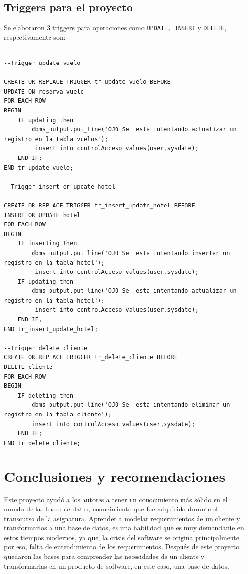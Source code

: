 \documentclass{article}
\begin{document}
\subsection{Triggers para el proyecto}
Se elaboraron 3 triggers para operaciones como \texttt{UPDATE, INSERT} y \texttt{DELETE}, respectivamente son:
\begin{lstlisting}

--Trigger update vuelo

CREATE OR REPLACE TRIGGER tr_update_vuelo BEFORE
UPDATE ON reserva_vuelo
FOR EACH ROW
BEGIN
    IF updating then
        dbms_output.put_line('OJO Se  esta intentando actualizar un registro en la tabla vuelos');
         insert into controlAcceso values(user,sysdate);
    END IF;
END tr_update_vuelo;

--Trigger insert or update hotel

CREATE OR REPLACE TRIGGER tr_insert_update_hotel BEFORE
INSERT OR UPDATE hotel
FOR EACH ROW
BEGIN
    IF inserting then
        dbms_output.put_line('OJO Se  esta intentando insertar un registro en la tabla hotel');
         insert into controlAcceso values(user,sysdate);
    IF updating then
        dbms_output.put_line('OJO Se  esta intentando actualizar un registro en la tabla hotel');
         insert into controlAcceso values(user,sysdate);
    END IF;
END tr_insert_update_hotel;

--Trigger delete cliente
CREATE OR REPLACE TRIGGER tr_delete_cliente BEFORE
DELETE cliente
FOR EACH ROW
BEGIN  
    IF deleting then
        dbms_output.put_line('OJO Se  esta intentando eliminar un registro en la tabla cliente');
        insert into controlAcceso values(user,sysdate);
    END IF;
END tr_delete_cliente;
\end{lstlisting}


\newpage
\section{Conclusiones y recomendaciones}

Este proyecto ayudó a los autores a tener un conocimiento más sólido en el mundo de las bases de datos, conocimiento que fue adquirido durante el transcurso de la asignatura. Aprender a modelar requerimientos de un cliente y transformarlos a una base de datos, es una habilidad que es muy demandante en estos tiempos modernos, ya que, la crisis del software se origina principalmente por eso, falta de entendimiento de los requerimientos. Después de este proyecto quedaron las bases para comprender las necesidades de un cliente y transformarlas en un producto de software, en este caso, una base de datos.  
\end{document}
